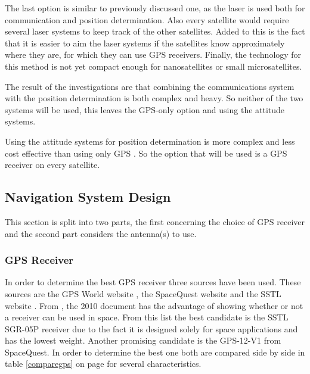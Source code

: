 The last option is similar to previously discussed one, as the laser is used both for communication and position determination. Also every satellite would require several laser systems to keep track of the other satellites. Added to this is the fact that it is easier to aim the laser systems if the satellites know approximately where they are, for which they can use \acs{GPS} receivers. Finally, the technology for this method is not yet compact enough for nanosatellites or small microsatellites.

The result of the investigations are that combining the communications system with the position determination is both complex and heavy. So neither of the two systems will be used, this leaves the \acs{GPS}-only option and using the attitude systems.

Using the attitude systems for position determination is more complex and less cost effective than using only \acs{GPS} \cite{MicroGPS}. So the option that will be used is a \acs{GPS} receiver on every satellite.

\subsection{Navigation System Design}
\label{navi3}
This section is split into two parts, the first concerning the choice of \acs{GPS} receiver and the second part considers the antenna(s) to use.

\subsubsection{GPS Receiver}
In order to determine the best \acs{GPS} receiver three sources have been used. These sources are the GPS World website \cite{SurveyGPS}, the SpaceQuest website \cite{spacequest} and the \ac{SSTL} website \cite{Surreygps}. From \cite{SurveyGPS}, the 2010 document has the advantage of showing whether or not a receiver can be used in space. From this list the best candidate is the \acs{SSTL} SGR-05P receiver due to the fact it is designed solely for space applications and has the lowest weight. Another promising candidate is the GPS-12-V1 from SpaceQuest. In order to determine the best one both are compared side by side in table \ref{comparegps} on page \pageref{comparegps} for several characteristics.

